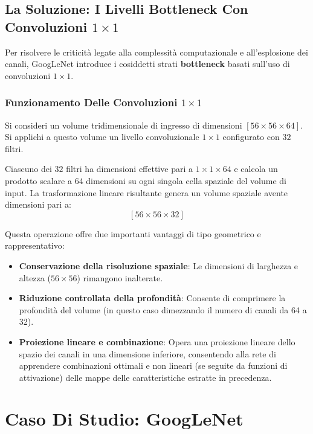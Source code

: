 ﻿\documentclass[11pt, a4paper]{article}
\begin{document}
\subsection{La Soluzione: I Livelli Bottleneck Con Convoluzioni $1 \times 1$}

Per risolvere le criticità legate alla complessità computazionale e all'esplosione dei canali, GoogLeNet introduce i cosiddetti strati \textbf{bottleneck} basati sull'uso di convoluzioni $1 \times 1$.

\subsubsection{Funzionamento Delle Convoluzioni $1 \times 1$}

Si consideri un volume tridimensionale di ingresso di dimensioni $[56 \times 56 \times 64]$. Si applichi a questo volume un livello convoluzionale $1 \times 1$ configurato con $32$ filtri.


Ciascuno dei $32$ filtri ha dimensioni effettive pari a $1 \times 1 \times 64$ e calcola un prodotto scalare a 64 dimensioni su ogni singola cella spaziale del volume di input. La trasformazione lineare risultante genera un volume spaziale avente dimensioni pari a:
\[
\boxed{[56 \times 56 \times 32]}
\]

Questa operazione offre due importanti vantaggi di tipo geometrico e rappresentativo:
\begin{itemize}
    \item \textbf{Conservazione della risoluzione spaziale}: Le dimensioni di larghezza e altezza ($56 \times 56$) rimangono inalterate.
    \item \textbf{Riduzione controllata della profondità}: Consente di comprimere la profondità del volume (in questo caso dimezzando il numero di canali da 64 a 32).
    \item \textbf{Proiezione lineare e combinazione}: Opera una proiezione lineare dello spazio dei canali in una dimensione inferiore, consentendo alla rete di apprendere combinazioni ottimali e non lineari (se seguite da funzioni di attivazione) delle mappe delle caratteristiche estratte in precedenza.
\end{itemize}

\section{Caso Di Studio: GoogLeNet}
\end{document}
